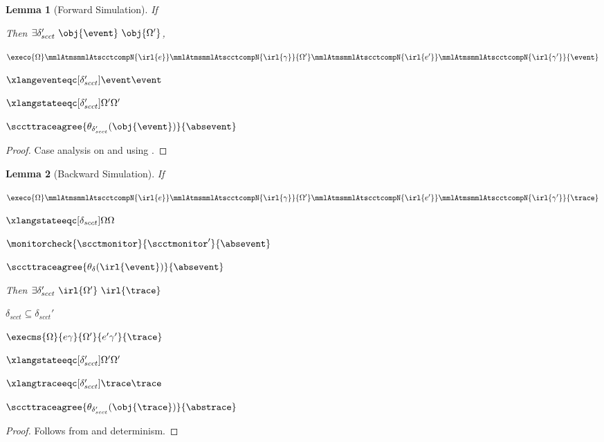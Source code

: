 \documentclass[a4paper,names,dvipsnames]{article}
\newtheorem{lemma}{Lemma}
\begin{document}
\begin{lemma}[Forward Simulation]\label{lem:steps:forwardsim:scct}
  If
  Then $\exists \delta_{scct}'\ \obj{\event}\ \obj{\Omega'}$,
  \begin{goals}
    \item $\execo{\Omega}\mmlAtmsmmlAtscctcompN{\irl{e}}\mmlAtmsmmlAtscctcompN{\irl{\gamma}}{\Omega'}\mmlAtmsmmlAtscctcompN{\irl{e'}}\mmlAtmsmmlAtscctcompN{\irl{\gamma'}}{\event}$
    \item $\xlangeventeqc[\delta_{scct}']{\event}{\event}$
    \item $\xlangstateeqc[\delta_{scct}']{\Omega'}{\Omega'}$
    \item $\sccttraceagree{\theta_{\delta_{scct}'}(\obj{\event})}{\absevent}$
  \end{goals}
\end{lemma}
\begin{proof}
  Case analysis on  and using .
\end{proof}


\begin{lemma}[Backward Simulation]
  If
  \begin{assumptions}
    \item $\execo{\Omega}\mmlAtmsmmlAtscctcompN{\irl{e}}\mmlAtmsmmlAtscctcompN{\irl{\gamma}}{\Omega'}\mmlAtmsmmlAtscctcompN{\irl{e'}}\mmlAtmsmmlAtscctcompN{\irl{\gamma'}}{\trace}$
    \item $\xlangstateeqc[\delta_{scct}]{\Omega}{\Omega}$
    \item $\monitorcheck{\scctmonitor}{\scctmonitor'}{\absevent}$
    \item $\sccttraceagree{\theta_{\delta}(\irl{\event})}{\absevent}$
  \end{assumptions}
  Then $\exists \delta_{scct}'\ \irl{\Omega'}\ \irl{\trace}$
  \begin{goals}
    \item $\delta_{scct}\subseteq\delta_{scct}'$
    \item $\execms{\Omega}{e\gamma}{\Omega'}{e'\gamma'}{\trace}$
    \item $\xlangstateeqc[\delta_{scct}']{\Omega'}{\Omega'}$
    \item $\xlangtraceeqc[\delta_{scct}']{\trace}{\trace}$
    \item $\sccttraceagree{\theta_{\delta_{scct}'}(\obj{\trace})}{\abstrace}$
  \end{goals}
\end{lemma}
\begin{proof}
  Follows from  and determinism.
\end{proof}
\end{document}

